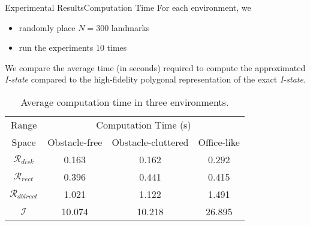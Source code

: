 \begin{frame}{Experimental Results}{Computation Time}
  For each environment, we
  \begin{itemize}
  \item randomly place $N = 300$ landmarks 
  \item run the  experiments $10$ times
  \end{itemize} 
  \begin{block}{}
    \small{We compare the average time (in seconds) required to compute the
      approximated \emph{I-state} compared to the high-fidelity polygonal
      representation of the exact \emph{I-state}.}
  \end{block}
\begin{table}
  \footnotesize\centering
    \begin{tabular}{cccc} 
    \hline
    Range & \multicolumn{3}{c}{Computation Time (s)}  \\
    Space & Obstacle-free & Obstacle-cluttered & Office-like\\
    \hline
    $\mathcal{R}_{disk}$ & 0.163  & 0.162   & 0.292  \\ 
    \hline
    $\mathcal{R}_{rect}$ & 0.396   & 0.441  & 0.415  \\
    \hline
    $\mathcal{R}_{dblrect}$ & 1.021  & 1.122  & 1.491  \\
    \hline
    $\mathcal{I}$ & 10.074  & 10.218  & 26.895  \\
    \hline
    \end{tabular}
    \caption{\scriptsize{Average computation time in three environments.}}
\end{table}
\end{frame}